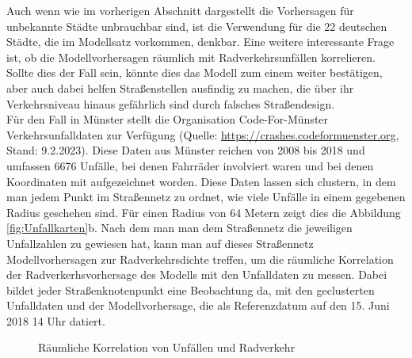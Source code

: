 \documentclass[a4paper,12pt]{thesis}
\begin{document}
Auch wenn wie im vorherigen Abschnitt dargestellt die Vorhersagen für unbekannte Städte unbrauchbar sind, ist die Verwendung für die 22 deutschen Städte, die im Modellsatz vorkommen, denkbar. Eine weitere interessante Frage ist, ob die Modellvorhersagen räumlich mit Radverkehrsunfällen korrelieren. Sollte dies der Fall sein, könnte dies das Modell zum einem weiter bestätigen, aber auch dabei helfen Straßenstellen ausfindig zu machen, die über ihr Verkehrsniveau hinaus gefährlich sind durch falsches Straßendesign.\\
Für den Fall in Münster stellt die Organisation Code-For-Münster Verkehrsunfalldaten zur Verfügung (Quelle: \url{https://crashes.codeformuenster.org}, Stand: 9.2.2023). Diese Daten aus Münster reichen von 2008 bis 2018 und umfassen 6676 Unfälle, bei denen Fahrräder involviert waren und bei denen Koordinaten mit aufgezeichnet worden. Diese Daten lassen sich clustern, in dem man jedem Punkt im Straßennetz zu ordnet, wie viele Unfälle in einem gegebenen Radius geschehen sind. Für einen Radius von 64 Metern zeigt dies die Abbildung \ref{fig:Unfallkarten}b. Nach dem man man dem Straßennetz die jeweiligen Unfallzahlen zu gewiesen hat, kann man auf dieses Straßennetz Modellvorhersagen zur Radverkehrsdichte treffen, um die räumliche Korrelation der Radverkerhsvorhersage des Modells mit den Unfalldaten zu messen. Dabei bildet jeder Straßenknotenpunkt eine Beobachtung da, mit den geclusterten Unfalldaten und der Modellvorhersage, die als Referenzdatum auf den 15. Juni 2018 14 Uhr datiert.\\

\begin{figure}%
	\centering
	\qquad
	\caption{Räumliche Korrelation von Unfällen und Radverkehr}%
	\label{fig:UnfallKorrelatoon}%
\end{figure}
\end{document}
